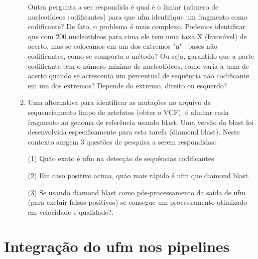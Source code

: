 \documentclass[12pt]{article}
\begin{document}
\begin{itemize}
\begin{enumerate}
                    Outra pergunta a ser respondida é qual é o limiar (número de nucleotídeos codificantes) para que \gls{ufm} identifique um fragmento como codificante? De fato, o problema é mais complexo. Podemos identificar que com 200 nucleotídeos para cima ele tem uma taxa X (favorável) de acerto, mas se colocamos em um dos extremos "n" \  bases não codificantes, como se comporta o método? Ou seja, garantido que a parte codificante tem o número mínimo de nucleotídeos, como varia a taxa de acerto quando se acrescenta um percentual de sequência não codificante em um dos extremos? Depende do extremo, direito ou esquerdo?

              \item Uma alternativa para identificar as mutações no arquivo de sequenciamento limpo de artefatos (obter o VCF), é alinhar cada fragmento ao genoma de referência usando blast. Uma versão do blast foi desenvolvida especificamente para esta tarefa (diamond  blast). Neste contexto surgem 3 questões de pesquisa a serem respondidas:

                    (1) Quão exato é \gls{ufm} na detecção de sequências codificantes

                    (2) Em caso positivo acima, quão mais rápido é \gls{ufm} que diamond blast.

                    (3) Se usando diamond blast como pós-processamento da saída de \gls{ufm} (para excluir falsos positivos)  se consegue um processamento otimizado em velocidade e qualidade?.

          \end{enumerate}

\end{itemize}

\section{Integração do \gls{ufm} nos pipelines}
\end{document}

